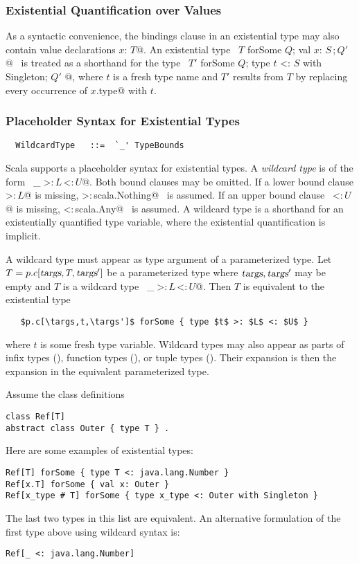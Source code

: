 \subsubsection*{Existential Quantification over Values}\label{sec:val-existential-types}

As a syntactic convenience, the bindings clause
in an existential type may also contain
value declarations \lstinline@val $x$: $T$@. 
An existential type ~\lstinline@$T$ forSome { $Q$; val $x$: $S\,$;$\,Q'$ }@~
is treated as a shorthand for the type
~\lstinline@$T'$ forSome { $Q$; type $t$ <: $S$ with Singleton; $Q'$ }@, where $t$ is a fresh
type name and $T'$ results from $T$ by replacing every occurrence of 
\lstinline@$x$.type@ with $t$.

\subsubsection*{Placeholder Syntax for Existential Types}\label{sec:impl-existential-types}

\syntax\begin{lstlisting}
  WildcardType   ::=  `_' TypeBounds
\end{lstlisting}

Scala supports a placeholder syntax for existential types.
A {\em wildcard type} is of the form ~\lstinline@_$\;$>:$\,L\,$<:$\,U$@. Both bound
clauses may be omitted. If a lower bound clause \lstinline@>:$\,L$@ is missing, 
\lstinline@>:$\,$scala.Nothing@~
is assumed. If an upper bound clause ~\lstinline@<:$\,U$@ is missing, 
\lstinline@<:$\,$scala.Any@~ is assumed. A wildcard type is a shorthand for an 
existentially quantified type variable, where the existential quantification is implicit.

A wildcard type must appear as type argument of a parameterized type.
Let $T = p.c[\mbox{\sl targs},T,\mbox{\sl targs}']$ be a parameterized type where $\mbox{\sl targs}, \mbox{\sl targs}'$ may be empty and
$T$ is a wildcard type ~\lstinline@_$\;$>:$\,L\,$<:$\,U$@. Then $T$ is equivalent to the existential
type 
\begin{lstlisting}
   $p.c[\targs,t,\targs']$ forSome { type $t$ >: $L$ <: $U$ }
\end{lstlisting}
where $t$ is some fresh type variable. 
Wildcard types may also appear as parts of infix types
(), function types (),
or tuple types ().
Their expansion is then the expansion in the equivalent parameterized
type.

\example Assume the class definitions
\begin{lstlisting}
class Ref[T]
abstract class Outer { type T } .
\end{lstlisting}
Here are some examples of existential types:
\begin{lstlisting}
Ref[T] forSome { type T <: java.lang.Number }
Ref[x.T] forSome { val x: Outer }
Ref[x_type # T] forSome { type x_type <: Outer with Singleton }
\end{lstlisting}
The last two types in this list are equivalent.
An alternative formulation of the first type above using wildcard syntax is:
\begin{lstlisting}
Ref[_ <: java.lang.Number]
\end{lstlisting}

